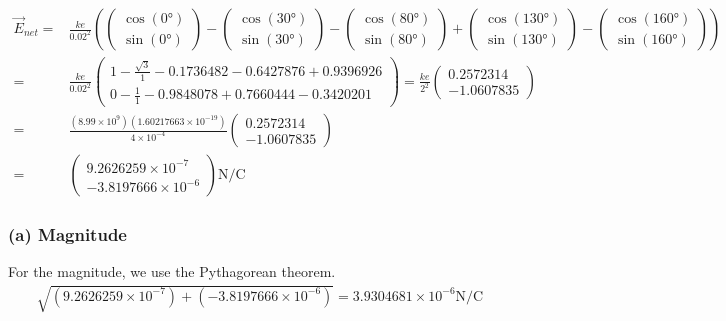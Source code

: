 \documentclass[12pt]{article}
\begin{document}
\begin{align*}
    \vec{E}_{net}   =&  \frac{ke}{0.02^2}\left(\begin{pmatrix}\cos(0\unit{\degree})\\ \sin(0\unit{\degree})\end{pmatrix}
        - \begin{pmatrix}\cos(30\unit{\degree})\\ \sin(30\unit{\degree})\end{pmatrix}
        - \begin{pmatrix}\cos(80\unit{\degree})\\ \sin(80\unit{\degree})\end{pmatrix}
        + \begin{pmatrix}\cos(130\unit{\degree})\\ \sin(130\unit{\degree})\end{pmatrix}
        - \begin{pmatrix}\cos(160\unit{\degree})\\ \sin(160\unit{\degree})\end{pmatrix}\right)\\
        =&  \frac{ke}{0.02^2} \begin{pmatrix}
            1   - \frac{\sqrt{3}}{1}    - 0.1736482 - 0.6427876    + 0.9396926\\
            0   - \frac{1}{1}           - 0.9848078 + 0.7660444    - 0.3420201
        \end{pmatrix}
        =   \frac{ke}{2^2} \begin{pmatrix}
            0.2572314\\
            -1.0607835
        \end{pmatrix}\\
        =&  \frac{(8.99 \times 10^{9})(1.60217663 \times 10^{-19})}{4 \times 10^{-4}}\begin{pmatrix} 0.2572314 \\ -1.0607835\end{pmatrix}\\
        =&  \begin{pmatrix} 9.2626259 \times 10^{-7} \\ -3.8197666 \times 10^{-6} \end{pmatrix} \unit{\newton/\coulomb}
\end{align*}

\subsubsection*{(a) Magnitude}
For the magnitude, we use the Pythagorean theorem.
\begin{align*}
    \sqrt{(9.2626259 \times 10^{-7}) + (-3.8197666 \times 10^{-6})} = \boxed{3.9304681 \times 10^{-6} \unit{\newton/\coulomb}}
\end{align*}
\end{document}

